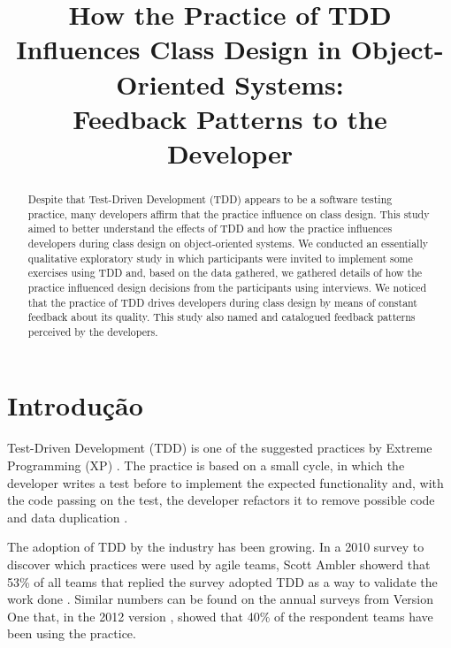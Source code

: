 \documentclass[conference]{IEEEtran}
\begin{document}
	
\title{How the Practice of TDD Influences Class Design in Object-Oriented Systems: \\Feedback Patterns to the Developer}

\author{
}

\maketitle

\begin{abstract} 
	Despite that Test-Driven Development (TDD) appears to be a software testing practice, 
	many developers affirm that the practice influence on class design. This study aimed
	to better understand the effects of TDD and how the practice influences developers
	during class design on object-oriented systems. 
	We conducted an essentially qualitative exploratory study in which participants
	were invited to implement some exercises using TDD and, based on the data gathered,
	we gathered details of how the practice influenced design decisions from the
	participants using interviews.
	We noticed that the practice of TDD drives
	developers during class design by means of constant feedback about its quality. This study
	also named and catalogued feedback patterns perceived by the developers.
\end{abstract}

\IEEEpeerreviewmaketitle

\section{Introdução}

Test-Driven Development (TDD) is one of the suggested practices
by Extreme Programming (XP) \cite{XPExplained}. The practice is based on
a small cycle, in which the developer writes a test before to implement
the expected functionality and, with the code passing on the
test, the developer refactors it to remove possible code 
and data duplication \cite{TDDByExample}.

The adoption of TDD by the industry has been growing. In a 2010 survey to discover
which practices were used by agile teams, Scott Ambler showerd that 53\% of all teams
that replied the survey adopted TDD as a way to validate the work done
\cite{wambler-survey-agile}. Similar numbers can be found on the annual surveys from
Version One that, in the 2012 version \cite{versionone-2012}, showed that
40\% of the respondent teams have been using the practice.
\end{document}
